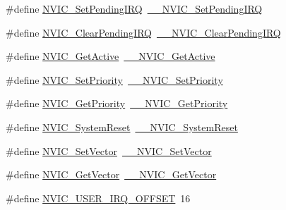 \begin{DoxyCompactItemize}
\item 
\#define \mbox{\hyperlink{group___c_m_s_i_s___core___n_v_i_c_functions_ga2b47e2e52cf5c48a5c3348636434b3ac}{N\+V\+I\+C\+\_\+\+Set\+Pending\+I\+RQ}}~\mbox{\hyperlink{group___c_m_s_i_s___core___n_v_i_c_functions_gaabefdd4b790b9a7308929938c0c1e1ad}{\+\_\+\+\_\+\+N\+V\+I\+C\+\_\+\+Set\+Pending\+I\+RQ}}
\item 
\#define \mbox{\hyperlink{group___c_m_s_i_s___core___n_v_i_c_functions_ga590cf113000a079b1f0ea3dcd5b5316c}{N\+V\+I\+C\+\_\+\+Clear\+Pending\+I\+RQ}}~\mbox{\hyperlink{group___c_m_s_i_s___core___n_v_i_c_functions_ga562a86dbdf14827d0fee8fdafb04d191}{\+\_\+\+\_\+\+N\+V\+I\+C\+\_\+\+Clear\+Pending\+I\+RQ}}
\item 
\#define \mbox{\hyperlink{group___c_m_s_i_s___core___n_v_i_c_functions_ga58ad3f352f832235ab3b192ff4745320}{N\+V\+I\+C\+\_\+\+Get\+Active}}~\mbox{\hyperlink{group___c_m_s_i_s___core___n_v_i_c_functions_gaa2837003c28c45abf193fe5e8d27f593}{\+\_\+\+\_\+\+N\+V\+I\+C\+\_\+\+Get\+Active}}
\item 
\#define \mbox{\hyperlink{group___c_m_s_i_s___core___n_v_i_c_functions_gae0e9d0e2f7b6133828c71b57d4941c35}{N\+V\+I\+C\+\_\+\+Set\+Priority}}~\mbox{\hyperlink{group___c_m_s_i_s___core___n_v_i_c_functions_ga505338e23563a9c074910fb14e7d45fd}{\+\_\+\+\_\+\+N\+V\+I\+C\+\_\+\+Set\+Priority}}
\item 
\#define \mbox{\hyperlink{group___c_m_s_i_s___core___n_v_i_c_functions_gaf59b9d0a791d2157abb319753953eceb}{N\+V\+I\+C\+\_\+\+Get\+Priority}}~\mbox{\hyperlink{group___c_m_s_i_s___core___n_v_i_c_functions_gaeb9dc99c8e7700668813144261b0bc73}{\+\_\+\+\_\+\+N\+V\+I\+C\+\_\+\+Get\+Priority}}
\item 
\#define \mbox{\hyperlink{group___c_m_s_i_s___core___n_v_i_c_functions_ga6aa0367d3642575610476bf0366f0c48}{N\+V\+I\+C\+\_\+\+System\+Reset}}~\mbox{\hyperlink{group___c_m_s_i_s___core___n_v_i_c_functions_ga49f66a3782cbff3b821bd9802cd046f5}{\+\_\+\+\_\+\+N\+V\+I\+C\+\_\+\+System\+Reset}}
\item 
\#define \mbox{\hyperlink{group___c_m_s_i_s___core___n_v_i_c_functions_ga804af63bb4c4c317387897431814775d}{N\+V\+I\+C\+\_\+\+Set\+Vector}}~\mbox{\hyperlink{group___c_m_s_i_s___core___n_v_i_c_functions_ga0df355460bc1783d58f9d72ee4884208}{\+\_\+\+\_\+\+N\+V\+I\+C\+\_\+\+Set\+Vector}}
\item 
\#define \mbox{\hyperlink{group___c_m_s_i_s___core___n_v_i_c_functions_ga955eb1c33a3dcc62af11a8385e8c0fc8}{N\+V\+I\+C\+\_\+\+Get\+Vector}}~\mbox{\hyperlink{group___c_m_s_i_s___core___n_v_i_c_functions_ga44b665d2afb708121d9b10c76ff00ee5}{\+\_\+\+\_\+\+N\+V\+I\+C\+\_\+\+Get\+Vector}}
\item 
\#define \mbox{\hyperlink{group___c_m_s_i_s___core___n_v_i_c_functions_ga8045d905a5ca57437d8e6f71ffcb6df5}{N\+V\+I\+C\+\_\+\+U\+S\+E\+R\+\_\+\+I\+R\+Q\+\_\+\+O\+F\+F\+S\+ET}}~16
\end{DoxyCompactItemize}

